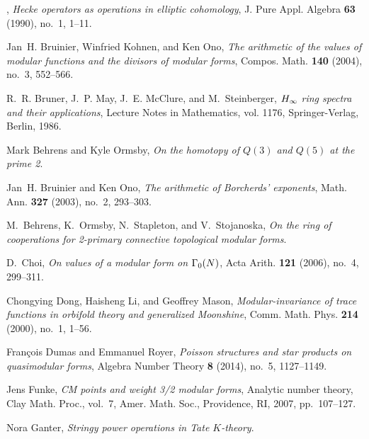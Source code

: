 \documentclass{gtpart}
\theoremstyle{definition}
\theoremstyle{remark}
\renewcommand{\=}{\approx}
\renewcommand{\-}{\sim}
\numberwithin{equation}{section}
\numberwithin{thm}{section}
\begin{document}
\begin{thebibliography}
\bysame, \emph{Hecke operators as operations in elliptic cohomology}, J. Pure
  Appl. Algebra \textbf{63} (1990), no.~1, 1--11. 

Jan~H. Bruinier, Winfried Kohnen, and Ken Ono, \emph{The arithmetic of the
  values of modular functions and the divisors of modular forms}, Compos. Math.
  \textbf{140} (2004), no.~3, 552--566. 

R.~R. Bruner, J.~P. May, J.~E. McClure, and M.~Steinberger, \emph{{$H\sb \infty
  $} ring spectra and their applications}, Lecture Notes in Mathematics, vol.
  1176, Springer-Verlag, Berlin, 1986. 

Mark Behrens and Kyle Ormsby, \emph{On the homotopy of {$Q(3)$} and {$Q(5)$} at
  the prime 2}.  

Jan~H. Bruinier and Ken Ono, \emph{The arithmetic of {B}orcherds' exponents},
  Math. Ann. \textbf{327} (2003), no.~2, 293--303. 

M.~Behrens, K.~Ormsby, N.~Stapleton, and V.~Stojanoska, \emph{On the ring of
  cooperations for 2-primary connective topological modular forms}. 

D.~Choi, \emph{On values of a modular form on {$\Gamma\sb 0(N)$}}, Acta Arith.
  \textbf{121} (2006), no.~4, 299--311. 

Chongying Dong, Haisheng Li, and Geoffrey Mason, \emph{Modular-invariance of
  trace functions in orbifold theory and generalized {M}oonshine}, Comm. Math.
  Phys. \textbf{214} (2000), no.~1, 1--56. 

Fran{\c{c}}ois Dumas and Emmanuel Royer, \emph{Poisson structures and star
  products on quasimodular forms}, Algebra Number Theory \textbf{8} (2014),
  no.~5, 1127--1149. \linebreak {}

Jens Funke, \emph{C{M} points and weight 3/2 modular forms}, Analytic number
  theory, Clay Math. Proc., vol.~7, Amer. Math. Soc., Providence, RI, 2007,
  pp.~107--127. 

Nora Ganter, \emph{Stringy power operations in {T}ate {$K$}-theory}. 


\end{thebibliography}
\end{document}
